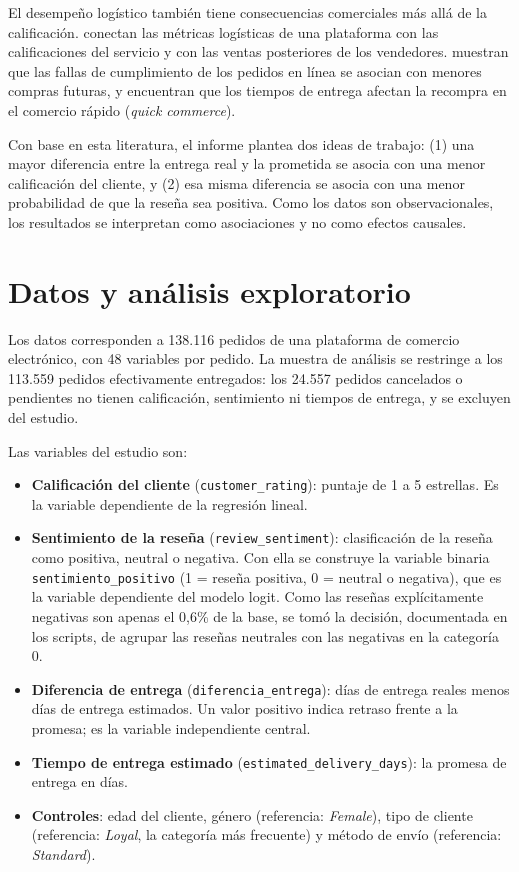 \documentclass[11pt]{article}
\begin{document}
El desempeño logístico también tiene consecuencias comerciales más allá de la
calificación. \textcite{deshpande2023} conectan las métricas logísticas de una
plataforma con las calificaciones del servicio y con las ventas posteriores de
los vendedores. \textcite{rao2011} muestran que las fallas de cumplimiento de
los pedidos en línea se asocian con menores compras futuras, y
\textcite{harter2025} encuentran que los tiempos de entrega afectan la
recompra en el comercio rápido (\textit{quick commerce}).

Con base en esta literatura, el informe plantea dos ideas de trabajo:
(1) una mayor diferencia entre la entrega real y la prometida se asocia con
una menor calificación del cliente, y (2) esa misma diferencia se asocia con
una menor probabilidad de que la reseña sea positiva. Como los datos son
observacionales, los resultados se interpretan como asociaciones y no como
efectos causales.

\section{Datos y análisis exploratorio}

Los datos corresponden a 138.116 pedidos de una plataforma de comercio
electrónico, con 48 variables por pedido. La muestra de análisis se restringe
a los 113.559 pedidos efectivamente entregados: los 24.557 pedidos cancelados
o pendientes no tienen calificación, sentimiento ni tiempos de entrega, y se
excluyen del estudio.

Las variables del estudio son:

\begin{itemize}
    \item \textbf{Calificación del cliente} (\texttt{customer\_rating}):
    puntaje de 1 a 5 estrellas. Es la variable dependiente de la regresión
    lineal.
    \item \textbf{Sentimiento de la reseña} (\texttt{review\_sentiment}):
    clasificación de la reseña como positiva, neutral o negativa. Con ella se
    construye la variable binaria \texttt{sentimiento\_positivo}
    (1 = reseña positiva, 0 = neutral o negativa), que es la variable
    dependiente del modelo logit. Como las reseñas explícitamente negativas
    son apenas el 0,6\% de la base, se tomó la decisión, documentada en los
    scripts, de agrupar las reseñas neutrales con las negativas en la
    categoría 0.
    \item \textbf{Diferencia de entrega} (\texttt{diferencia\_entrega}):
    días de entrega reales menos días de entrega estimados. Un valor positivo
    indica retraso frente a la promesa; es la variable independiente central.
    \item \textbf{Tiempo de entrega estimado}
    (\texttt{estimated\_delivery\_days}): la promesa de entrega en días.
    \item \textbf{Controles}: edad del cliente, género (referencia:
    \textit{Female}), tipo de cliente (referencia: \textit{Loyal}, la
    categoría más frecuente) y método de envío (referencia:
    \textit{Standard}).
\end{itemize}
\end{document}

